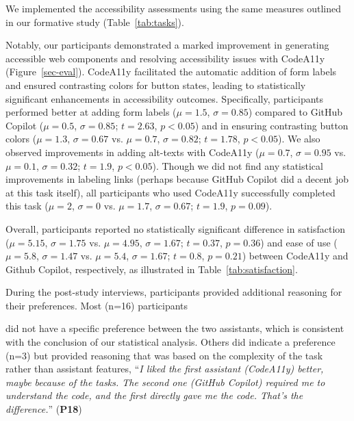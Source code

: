 \begin{highlight}We implemented the accessibility assessments using the same measures outlined in our formative study (Table~\ref{tab:tasks}).\end{highlight} Notably, our participants demonstrated a marked improvement in generating accessible web components and resolving accessibility issues with CodeA11y (Figure~\ref{sec-eval}). CodeA11y facilitated the automatic addition of form labels and ensured contrasting colors for button states, leading to statistically significant enhancements in accessibility outcomes. Specifically, participants performed better at adding form labels ($\mu=1.5$, $\sigma=0.85$) compared to GitHub Copilot ($\mu=0.5$, $\sigma=0.85$; $t=2.63$, $p<0.05$) and in ensuring contrasting button colors ($\mu=1.3$, $\sigma=0.67$ vs. $\mu=0.7$, $\sigma=0.82$; $t=1.78$, $p<0.05$). We also observed improvements in adding alt-texts with CodeA11y ($\mu=0.7$, $\sigma=0.95$ vs. $\mu=0.1$, $\sigma=0.32$; $t=1.9$, $p<0.05$). Though we did not find any statistical improvements in labeling links (perhaps because GitHub Copilot did a decent job at this task itself), all participants who used CodeA11y successfully completed this task ($\mu=2$, $\sigma=0$ vs. $\mu=1.7$, $\sigma=0.67$; $t=1.9$, $p=0.09$).

Overall, participants reported no statistically significant difference in satisfaction ($\mu=5.15$, $\sigma=1.75$ vs. $\mu=4.95$, $\sigma=1.67$; $t=0.37$, $p=0.36$) and ease of use ($\mu=5.8$, $\sigma=1.47$ vs. $\mu=5.4$, $\sigma=1.67$; $t=0.8$, $p=0.21$) between CodeA11y and Github Copilot, respectively, as illustrated in Table~\ref{tab:satisfaction}.

During the post-study interviews, participants provided additional reasoning for their preferences. Most (n=16) participants \begin{highlight} did not have a specific preference between the two assistants, which is consistent with the conclusion of our statistical analysis. 
Others did indicate a preference (n=3) but provided reasoning that was based on the complexity of the task rather than assistant features, ``\textit{I liked the first assistant (CodeA11y) better, maybe because of the tasks. The second one (GitHub Copilot) required me to understand the code, and the first directly gave me the code. That’s the difference.}'' (\textbf{P18}) \end{highlight}

